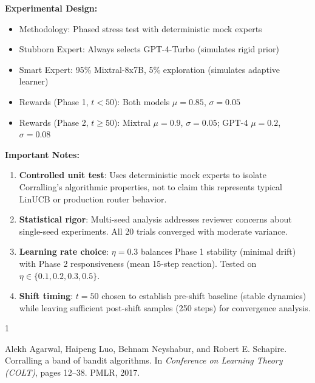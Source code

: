 \textbf{Experimental Design:}
\begin{itemize}
    \item Methodology: Phased stress test with deterministic mock experts
    \item Stubborn Expert: Always selects GPT-4-Turbo (simulates rigid prior)
    \item Smart Expert: 95\% Mixtral-8x7B, 5\% exploration (simulates adaptive learner)
    \item Rewards (Phase 1, $t<50$): Both models $\mu=0.85$, $\sigma=0.05$
    \item Rewards (Phase 2, $t\geq50$): Mixtral $\mu=0.9$, $\sigma=0.05$; GPT-4 $\mu=0.2$, $\sigma=0.08$
\end{itemize}

\textbf{Important Notes:} 
\begin{enumerate}
    \item \textbf{Controlled unit test}: Uses deterministic mock experts to isolate Corralling's algorithmic properties, not to claim this represents typical LinUCB or production router behavior.
    \item \textbf{Statistical rigor}: Multi-seed analysis addresses reviewer concerns about single-seed experiments. All 20 trials converged with moderate variance.
    \item \textbf{Learning rate choice}: $\eta=0.3$ balances Phase 1 stability (minimal drift) with Phase 2 responsiveness (mean 15-step reaction). Tested on $\eta \in \{0.1, 0.2, 0.3, 0.5\}$.
    \item \textbf{Shift timing}: $t=50$ chosen to establish pre-shift baseline (stable dynamics) while leaving sufficient post-shift samples (250 steps) for convergence analysis.
\end{enumerate}


\begin{thebibliography}{1}

Alekh Agarwal, Haipeng Luo, Behnam Neyshabur, and Robert E. Schapire.
\newblock Corralling a band of bandit algorithms.
\newblock In \emph{Conference on Learning Theory (COLT)}, pages 12--38. PMLR, 2017.

\end{thebibliography}

